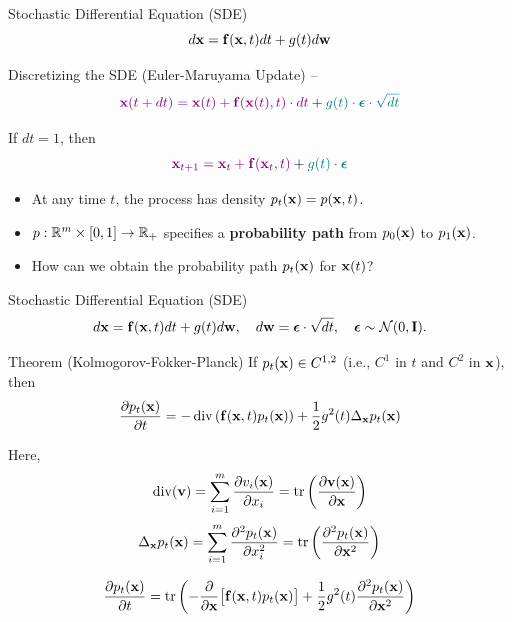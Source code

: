 \documentclass{beamer}
\renewcommand{\eqpause}{}
\begin{document}
\begin{frame}{Stochastic Differential Equation (SDE)}
	\[
		d\mathbf{x} = \mathbf{f}(\mathbf{x}, t) dt + g(t) d \mathbf{w}
	\]
	\vspace{-0.3cm}
	\begin{block}{Discretizing the SDE (Euler-Maruyama Update) – \SDESolve}
		\vspace{-0.3cm}
		\[
			{\color{violet}\mathbf{x}(t + dt) = \mathbf{x}(t) + \mathbf{f}(\mathbf{x}(t), t) \cdot dt} + {\color{teal}g(t) \cdot \boldsymbol{\epsilon} \cdot \sqrt{dt}}
		\]
		\eqpause
		If $dt=1$, then
		\vspace{-0.3cm}
		\[
			{\color{violet}\mathbf{x}_{t + 1} = \mathbf{x}_t + \mathbf{f}(\mathbf{x}_t, t)} + {\color{teal}g(t) \cdot \boldsymbol{\epsilon}}
		\]
		\vspace{-0.7cm}
	\end{block}
	\eqpause
	\begin{itemize}
		\item At any time $t$, the process has density $p_t(\mathbf{x}) = p(\mathbf{x}, t)$.
		\item $p: \mathbb{R}^m \times [0,1] \rightarrow \mathbb{R}_+$ specifies a \textbf{probability path} from $p_0(\mathbf{x})$ to $p_1(\mathbf{x})$.
		\item How can we obtain the probability path $p_t(\mathbf{x})$ for $\mathbf{x}(t)$?
	\end{itemize}
\end{frame}
\begin{frame}{Stochastic Differential Equation (SDE)}
	\vspace{-0.4cm}
	\[
		d\mathbf{x} = \mathbf{f}(\mathbf{x}, t) dt + g(t) d \mathbf{w},\quad d \mathbf{w} = \boldsymbol{\epsilon} \cdot \sqrt{dt},\quad \boldsymbol{\epsilon} \sim \mathcal{N}(0, \mathbf{I}).
	\]
	\vspace{-0.4cm}
	\begin{block}{Theorem (Kolmogorov-Fokker-Planck)}
		If $p_t(\mathbf{x}) \in C^{1,2}$ (i.e., $C^1$ in $t$ and $C^2$ in $\mathbf{x}$), then
		\vspace{-0.2cm}
		\[
			\frac{\partial p_t(\mathbf{x})}{\partial t} = - \operatorname{div}\left(\mathbf{f}(\mathbf{x}, t) p_t(\mathbf{x})\right) + \frac{1}{2}g^2(t) \Delta_{\mathbf{x}}p_t(\mathbf{x})
		\]
		\eqpause
		Here,
		\[
			\operatorname{div} (\mathbf{v}) = \sum_{i=1}^m \frac{\partial v_i(\mathbf{x})}{\partial x_i} = \operatorname{tr}\left( \frac{\partial \mathbf{v}(\mathbf{x})}{\partial \mathbf{x}}  \right)
		\]
		\[
			\Delta_{\mathbf{x}}p_t(\mathbf{x}) = \sum_{i=1}^m \frac{\partial^2 p_t(\mathbf{x})}{\partial x_i^2} = \operatorname{tr}\left( \frac{\partial^2 p_t(\mathbf{x})}{\partial \mathbf{x}^2}  \right)
		\]
		\eqpause
		\[
			\frac{\partial p_t(\mathbf{x})}{\partial t} = \operatorname{tr}\left( - \frac{\partial}{\partial \mathbf{x}} \bigl[ \mathbf{f}(\mathbf{x}, t) p_t(\mathbf{x})\bigr] + \frac{1}{2} g^2(t) \frac{\partial^2 p_t(\mathbf{x})}{\partial \mathbf{x}^2} \right)
		\]
	\end{block}
\end{frame}
\end{document}
